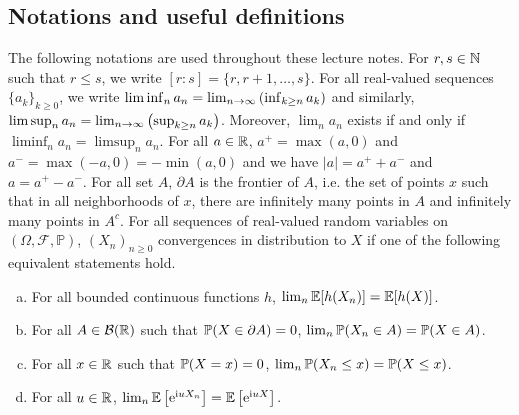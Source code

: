 \documentclass[english,graybox,envcountchap,envcountsame,sectrefs,shortlabels]{svmono}
\theoremstyle{style}
\newcommand{\borel}{\mathcal{B}}
\newcommand{\eqLaw}{\stackrel{\mathcal L}{=}}
\newcommand{\indep}{\rotatebox[origin=c]{90}{$\models$}}
\newcommand{\rme}{\mathrm{e}}
\newcommand{\rmi}{\mathrm{i}}
\begin{document}
\subsection*{Notations and useful definitions}
The following notations are used throughout these lecture notes. For $r,s \in \mathbb{N}$ such that $r\leq s$, we write $[r:s]=\{r,r+1,\ldots,s\}$. For all real-valued sequences $\{a_k\}_{k\geq 0}$, we write $\liminf_n a_n=\lim_{n \to\infty} \left(\inf_{k \geq n} a_k\right)$ and similarly, $\limsup_n a_n=\lim_{n \to\infty} \left(\sup_{k \geq n} a_k\right)$. Moreover, $\lim_n a_n$ exists if and only if $\liminf_n a_n=\limsup_n a_n$. For all $a\in \mathbb{R}$, $a^+=\max(a,0)$ and $a^-=\max(-a,0)=-\min(a,0)$ and we have $|a|=a^++a^-$ and $a=a^+-a^-$. For all set $A$, $\partial A$ is the frontier of $A$, i.e. the set of points $x$ such that in all neighborhoods of $x$, there are infinitely many points in $A$ and infinitely many points in $A^c$.
For all sequences of real-valued random variables on $(\Omega,\mathcal{F},\mathbb{P})$, $(X_n)_{n\geq 0}$ convergences in distribution to $X$ if one of the following  equivalent statements hold.
     \begin{enumerate}[(a)]
     \item For all bounded continuous functions $h$, $\lim_{n}\mathbb{E}[h(X_n)]=\mathbb{E}[h(X)]$.
    \item  For all $A \in \borel(\rset)$ such that $\mathbb{P}(X \in \partial A)=0$,  $\lim_n \mathbb{P}(X_n \in A)=\mathbb{P}(X\in A)$.
        \item For all $x\in \mathbb{R}$ such that $\mathbb{P}(X=x)=0$, $\lim_n \mathbb{P}(X_n \leq x)=\mathbb{P}(X \leq x)$.
\item For all $u \in \mathbb{R}$, $\lim_n \PE\lrb{\rme^{\rmi u X_n}}=\PE\lrb{\rme^{\rmi u X}}$.
     \end{enumerate}
\end{document}
